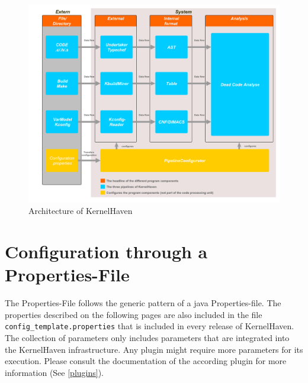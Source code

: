 \begin{figure}[h!] 
  \centering
  \begin{minipage}[b]{1\textwidth} 
    \caption{Architecture of KernelHaven}\label{fig:arch.simple}
    \includegraphics[width=1\textwidth]{Bilder/arch_simple.pdf}
  \end{minipage}
\end{figure}




\section{Configuration through a Properties-File} \label{properties}

The Properties-File follows the generic pattern of a java Properties-file. 
The properties described on the following pages are also included in the file \texttt{config\_template.properties} that is included in every release of KernelHaven. The collection of parameters only includes parameters that are integrated into the KernelHaven infrastructure. Any plugin might require more parameters for its execution. Please consult the documentation of the according plugin for more information (See \autoref{plugins}).

